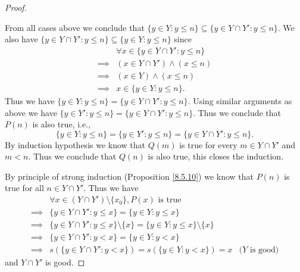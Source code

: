\begin{proof}
\begin{itemize}
    \end{itemize}
    From all cases above we conclude that \(\{y \in Y : y \leq n\} \subseteq \{y \in Y \cap Y' : y \leq n\}\).
    We also have \(\{y \in Y \cap Y' : y \leq n\} \subseteq \{y \in Y : y \leq n\}\) since
    \begin{align*}
                 & \forall x \in \{y \in Y \cap Y' : y \leq n\} \\
        \implies & (x \in Y \cap Y') \land (x \leq n)           \\
        \implies & (x \in Y) \land (x \leq n)                   \\
        \implies & x \in \{y \in Y : y \leq n\}.
    \end{align*}
    Thus we have \(\{y \in Y : y \leq n\} = \{y \in Y \cap Y' : y \leq n\}\).
    Using similar arguments as above we have \(\{y \in Y' : y \leq n\} = \{y \in Y \cap Y' : y \leq n\}\).
    Thus we conclude that \(P(n)\) is also true, i.e.,
    \[
        \{y \in Y : y \leq n\} = \{y \in Y' : y \leq n\} = \{y \in Y \cap Y' : y \leq n\}.
    \]
    By induction hypothesis we know that \(Q(m)\) is true for every \(m \in Y \cap Y'\) and \(m < n\).
    Thus we conclude that \(Q(n)\) is also true, this closes the induction.

    By principle of strong induction (Proposition \ref{8.5.10}) we know that \(P(n)\) is true for all \(n \in Y \cap Y'\).
    Thus we have
    \begin{align*}
                 & \forall x \in (Y \cap Y') \setminus \{x_0\}, P(x) \text{ is true}                                                \\
        \implies & \{y \in Y \cap Y' : y \leq x\} = \{y \in Y : y \leq x\}                                                          \\
        \implies & \{y \in Y \cap Y' : y \leq x\} \setminus \{x\} = \{y \in Y : y \leq x\} \setminus \{x\}                          \\
        \implies & \{y \in Y \cap Y' : y < x\} = \{y \in Y : y < x\}                                                                \\
        \implies & s(\{y \in Y \cap Y' : y < x\}) = s(\{y \in Y : y < x\}) = x                             & \text{(\(Y\) is good)}
    \end{align*}
    and \(Y \cap Y'\) is good.


\end{proof}
